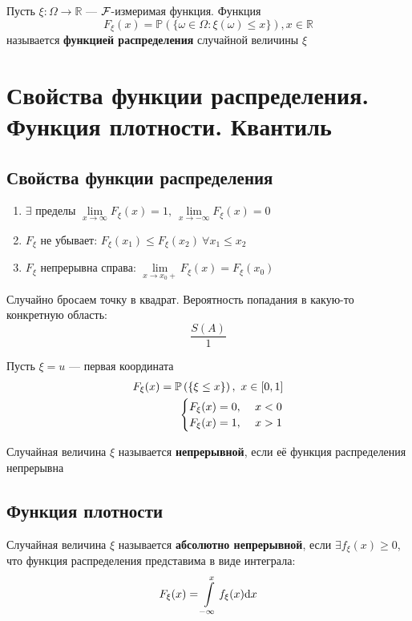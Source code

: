 \documentclass[a4paper, 10pt]{article}
\begin{document}
 Пусть $\xi:\Omega\rightarrow\mathbb{R}$ — $\mathcal{F}$-измеримая функция. Функция
$$F_\xi(x)=\mathbb{P}(\{\omega\in\Omega:\xi(\omega)\leqslant x\}),x\in\mathbb{R}$$
называется \textbf{функцией распределения} случайной величины $\xi$

\newpage
\section{Свойства функции распределения. Функция плотности. Квантиль}
\subsection{Свойства функции распределения}
\begin{enumerate}
    \item $\exists$ пределы $\lim\limits_{x\to\infty}F_\xi(x)=1,\ \lim\limits_{x\to-\infty}F_\xi(x)=0$
    \item $F_\xi$ не убывает: $F_\xi(x_1)\leqslant F_\xi(x_2)\ \forall x_1\leqslant x_2$
    \item $F_\xi$ непрерывна справа: $\lim\limits_{x\to x_0+}F_\xi(x)=F_\xi(x_0)$
\end{enumerate}

\ex Случайно бросаем точку в квадрат. Вероятность попадания в какую-то конкретную область:
\begin{equation*}
    \frac{S(A)}{1}
\end{equation*}

Пусть $\xi = u$ — первая координата
\begin{equation*}
    \begin{aligned}
        F_\xi(x)=\mathbb{P}\left(\{\xi\leq x\}\right),\ x\in[0, 1]\\
        \begin{cases}
            F_\xi(x)=0,\ & x<0\\
            F_\xi(x)=1,\ & x > 1
        \end{cases}
    \end{aligned}
\end{equation*}

 Случайная величина $\xi$ называется \textbf{непрерывной}, если её функция распределения непрерывна

\subsection{Функция плотности}
 Случайная величина $\xi$ называется \textbf{абсолютно непрерывной}, если $\exists f_\xi(x)\geqslant 0$, что функция распределения представима в виде интеграла:
\begin{equation*}
    F_\xi(x)=\int\limits_{-\infty}^xf_\xi(x)\text{d}x
\end{equation*}
\end{document}

